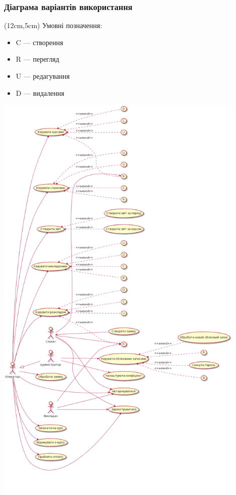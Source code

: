 \subsubsection{Діаграма варіантів використання}

\begin{flushright}
 \begin{textblock*}{5cm}(12cm,5cm)
  \footnotesize Умовні позначення:
   \begin{itemize}
    \item C --- створення
    \item R --- перегляд
    \item U --- редагування
    \item D --- видалення
   \end{itemize}
 \end{textblock*}
\end{flushright}

\includegraphics[width=12cm]{pp_pw1_uc.png}

